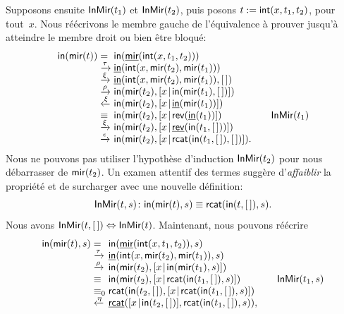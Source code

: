 Supposons ensuite \(\textsf{InMir}({t_1})\) et \(\textsf{InMir}({t_2})\), puis
posons \(t := \textsf{int}(x,t_1,t_2)\), pour tout~\(x\). Nous réécrivons
le membre gauche de l'équivalence à prouver jusqu'à atteindre le
membre droit ou bien être bloqué:
\begin{equation*}
\begin{array}{@{}r@{\;}l@{\;}l@{\qquad}r@{}}
\fun{in}(\fun{mir}(t)) & = &
\fun{in}(\ufun{mir}(\fun{int}(x,t_1,t_2)))\\
& \xrightarrow{\smash{\tau}}
& \ufun{in}(\fun{int}(x,\fun{mir}(t_2),\fun{mir}(t_1)))\\
& \xrightarrow{\smash{\xi}}
& \ufun{in}(\fun{int}(x,\fun{mir}(t_2),\fun{mir}(t_1)),\el)\\
& \xrightarrow{\smash{\rho}}
& \fun{in}(\fun{mir}(t_2),\cons{x}{\fun{in}(\fun{mir}(t_1),\el)})\\
& \xleftarrow{\smash{\xi}}
& \fun{in}(\fun{mir}(t_2),\cons{x}{\ufun{in}(\fun{mir}(t_1))})\\
& \equiv
& \fun{in}(\fun{mir}(t_2),\cons{x}{\fun{rev}(\ufun{in}(t_1))})
& \IH{\pred{InMir}{t_1}}\\
& \xrightarrow{\smash{\xi}}
& \fun{in}(\fun{mir}(t_2),\cons{x}{\ufun{rev}(\fun{in}(t_1,\el))})\\
& \xrightarrow{\smash{\epsilon}}
& \fun{in}(\fun{mir}(t_2),\cons{x}{\fun{rcat}(\fun{in}(t_1,\el),\el)}).
\end{array}
\end{equation*}
Nous ne pouvons pas utiliser l'hypothèse d'induction
\(\textsf{InMir}({t_2})\) pour nous débarrasser de \(\textsf{mir}(t_2)\). Un
examen attentif des termes suggère d'\emph{affaiblir} la propriété et
de surcharger  avec une nouvelle définition:
\begin{equation*}
\textsf{InMir}({t,s}) \colon \textsf{in}(\textsf{mir}(t),s) \equiv
\textsf{rcat}(\textsf{in}(t,[\,]),s).
\end{equation*}
Nous avons \(\textsf{InMir}({t,[\,]}) \Leftrightarrow
\textsf{InMir}({t})\). Maintenant, nous pouvons réécrire
\begin{equation*}
\begin{array}{@{}r@{\;}l@{\;}l@{\qquad}r@{}}
\fun{in}(\fun{mir}(t),s)
& =
& \fun{in}(\ufun{mir}(\fun{int}(x,t_1,t_2)),s)\\
& \xrightarrow{\smash{\tau}}
& \ufun{in}(\fun{int}(x,\fun{mir}(t_2),\fun{mir}(t_1)),s)\\
& \xrightarrow{\smash{\rho}}
& \fun{in}(\fun{mir}(t_2),\cons{x}{\fun{in}(\fun{mir}(t_1),s)})\\
& \equiv
& \fun{in}(\fun{mir}(t_2),\cons{x}{\fun{rcat}(\fun{in}(t_1,\el),s)})
& \IH{\pred{InMir}{t_1,s}}\\
& \equiv_0
& \fun{rcat}(\fun{in}(t_2,\el),\cons{x}{\fun{rcat}(\fun{in}(t_1,\el),s)})\\
& \xleftarrow{\smash{\eta}}
& \ufun{rcat}(\cons{x}{\fun{in}(t_2,\el)},\fun{rcat}(\fun{in}(t_1,\el),s)),
\end{array}
\end{equation*}
